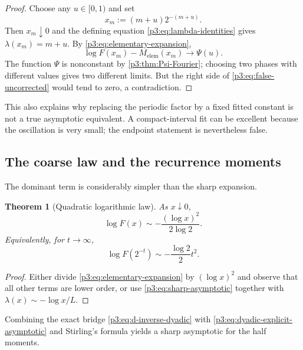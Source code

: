 \documentclass[11pt]{article}
\numberwithin{equation}{section}
\newtheorem{theorem}{Theorem}[section]
\theoremstyle{definition}
\theoremstyle{remark}
\begin{document}
\begin{proof}
Choose any $u\in[0,1)$ and set
\begin{equation}\label{p3:eq:phase-lock-sequence}
 x_m:=(m+u)2^{-(m+u)}.
\end{equation}
Then $x_m\downarrow0$ and the defining equation
\eqref{p3:eq:lambda-identities} gives $\lambda(x_m)=m+u$.  By
\eqref{p3:eq:elementary-expansion},
\begin{equation}\label{p3:eq:phase-lock-limit}
 \log F(x_m)-M_{\mathrm{elem}}(x_m)\longrightarrow\Psi(u).
\end{equation}
The function $\Psi$ is nonconstant by \cref{p3:thm:Psi-Fourier}; choosing two
phases with different values gives two different limits.  But the right side
of \eqref{p3:eq:false-uncorrected} would tend to zero, a contradiction.
\end{proof}

This also explains why replacing the periodic factor by a fixed fitted
constant is not a true asymptotic equivalent.  A compact-interval fit can be
excellent because the oscillation is very small; the endpoint statement is
nevertheless false.

\subsection{The coarse law and the recurrence moments}

The dominant term is considerably simpler than the sharp expansion.

\begin{theorem}[Quadratic logarithmic law]\label{p3:thm:coarse-asymptotic}
As $x\downarrow0$,
\begin{equation}\label{p3:eq:coarse-asymptotic}
 \boxed{
 \log F(x)\sim-\frac{(\log x)^2}{2\log2}.}
\end{equation}
Equivalently, for $t\to\infty$,
\begin{equation}\label{p3:eq:coarse-dyadic}
 \log F(2^{-t})\sim-\frac{\log2}{2}t^2.
\end{equation}
\end{theorem}

\begin{proof}
Either divide \eqref{p3:eq:elementary-expansion} by $(\log x)^2$ and observe that
all other terms are lower order, or use \eqref{p3:eq:sharp-asymptotic} together
with $\lambda(x)\sim-\log x/L$.
\end{proof}

Combining the exact bridge \eqref{p3:eq:d-inverse-dyadic} with
\eqref{p3:eq:dyadic-explicit-asymptotic} and Stirling's formula yields a sharp
asymptotic for the half moments.
\end{document}

